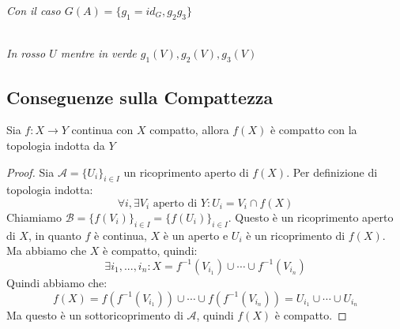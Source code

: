 \documentclass[11pt,a4paper,twoside]{article}
\theoremstyle{definition}
\begin{document}
\begin{center}
	\textit{Con il caso $G(A) = \{g_1 = id_G, g_2 g_3\}$}\\
	\\
	\textit{In rosso $U$ mentre in verde $g_1(V), g_2(V), g_3(V)$}
\end{center}

\subsection{Conseguenze sulla Compattezza}

\begin{prop}{}{}
	Sia $f:X \to Y$ continua con $X$ compatto, allora $f(X)$ è compatto con la topologia indotta da $Y$
\end{prop}

\begin{proof}
	Sia $\mathcal A = \{U_i\}_{i \in I}$ un ricoprimento aperto di $f(X)$. Per definizione di topologia indotta:
	\[ \forall i, \exists V_i\text{ aperto di }Y: U_i = V_i \cap f(X) \]
	Chiamiamo $\mathcal B = \{f(V_i)\}_{i \in I} = \{f(U_i)\}_{i \in I}$. Questo è un ricoprimento aperto di $X$, in quanto $f$ è continua, $X$ è un aperto e $U_i$ è un ricoprimento di $f(X)$.\\
	Ma abbiamo che $X$ è compatto, quindi:
	\[ \exists i_1,...,i_n: X = f^{-1}(V_{i_1}) \cup \cdots \cup f^{-1}(V_{i_n}) \]
	Quindi abbiamo che:
	\[ f(X) = f(f^{-1}(V_{i_1}))\cup \cdots \cup f(f^{-1}(V_{i_n})) = U_{i_1}\cup \cdots \cup U_{i_n}\]
	Ma questo è un sottoricoprimento di $\mathcal A$, quindi $f(X)$ è compatto.
\end{proof}
\end{document}
